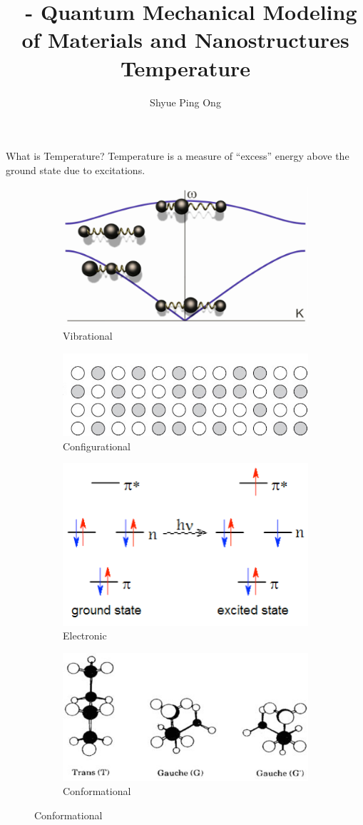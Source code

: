 \documentclass[aspectratio=169]{beamer}
\title[\classname Temperature]{\classname~- Quantum Mechanical Modeling of Materials and Nanostructures\\Temperature}
\author{Shyue Ping Ong}
\institute[UCSD]{University of California, San Diego\\
\medskip
}
\date{\classyear} %
\begin{document}
    \begin{frame}
        \titlepage %
    \end{frame}

\begin{frame}{What is Temperature?}
Temperature is a measure of ``excess'' energy above the ground state due to excitations.

\begin{figure}
    \centering
    \begin{subfigure}{0.45\textwidth}
        \centering
        \includegraphics[width=0.5\linewidth]{figures/10_vibrational.png}
    \caption{Vibrational}
    \end{subfigure}
    \begin{subfigure}{0.45\textwidth}
        \centering
        \includegraphics[width=0.7\linewidth]{figures/10_configurational.png}
    \caption{Configurational}
    \end{subfigure}
        \begin{subfigure}{0.45\textwidth}
        \centering
        \includegraphics[width=0.5\linewidth]{figures/10_electronic.png}
    \caption{Electronic}
    \end{subfigure}
    \begin{subfigure}{0.45\textwidth}
        \centering
        \includegraphics[width=0.7\linewidth]{figures/10_conformational.png}
    \caption{Conformational}
    \end{subfigure}
    \label{fig}
\end{figure} 


\end{frame}
\end{document}
